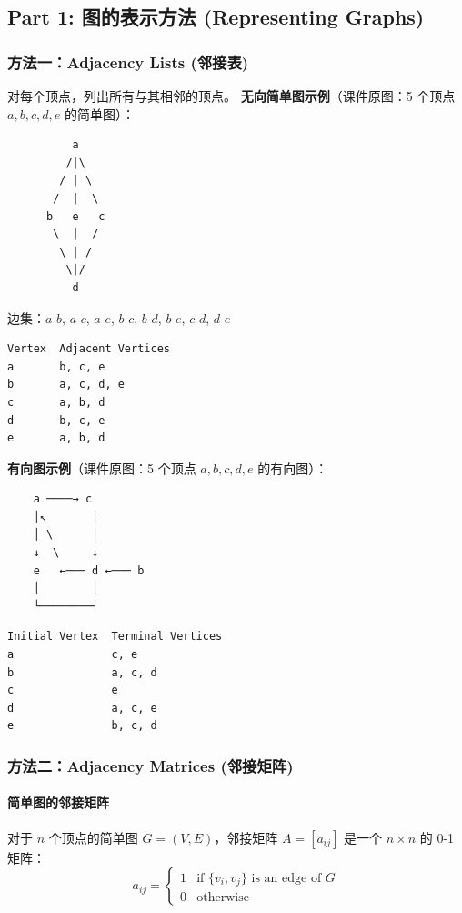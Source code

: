 \documentclass[10pt,a4paper,openany]{ctexbook}
\theoremstyle{definition}
\theoremstyle{remark}
\begin{document}
\vspace{-2pt}

\subsection{Part 1: 图的表示方法 (Representing Graphs)}

\subsubsection{方法一：Adjacency Lists (邻接表)}

对每个顶点，列出所有与其相邻的顶点。
\textbf{无向简单图示例}（课件原图：5 个顶点 $a, b, c, d, e$ 的简单图）：
{\footnotesize\begin{verbatim}
          a
         /|\
        / | \
       /  |  \
      b   e   c
       \  |  /
        \ | /
         \|/
          d
\end{verbatim}}

边集：$a$-$b$, $a$-$c$, $a$-$e$, $b$-$c$, $b$-$d$, $b$-$e$, $c$-$d$, $d$-$e$
{\footnotesize\begin{verbatim}
Vertex  Adjacent Vertices
a       b, c, e
b       a, c, d, e
c       a, b, d
d       b, c, e
e       a, b, d
\end{verbatim}}

\textbf{有向图示例}（课件原图：5 个顶点 $a, b, c, d, e$ 的有向图）：
{\footnotesize\begin{verbatim}
    a ────→ c
    │↖       │
    │ \      │
    ↓  \     ↓
    e   ←─── d ←─── b
    │        │
    └────────┘
\end{verbatim}}

{\footnotesize\begin{verbatim}
Initial Vertex  Terminal Vertices
a               c, e
b               a, c, d
c               e
d               a, c, e
e               b, c, d
\end{verbatim}}

\vspace{-2pt}

\subsubsection{方法二：Adjacency Matrices (邻接矩阵)}

\paragraph{简单图的邻接矩阵}

对于 $n$ 个顶点的简单图 $G = (V, E)$，邻接矩阵 $A = [a_{ij}]$ 是一个 $n \times n$ 的 0-1 矩阵：
\[
a_{ij} = 
\begin{cases}
1 & \text{if } \{v_i, v_j\} \text{ is an edge of } G \\
0 & \text{otherwise}
\end{cases}
\]
\end{document}
